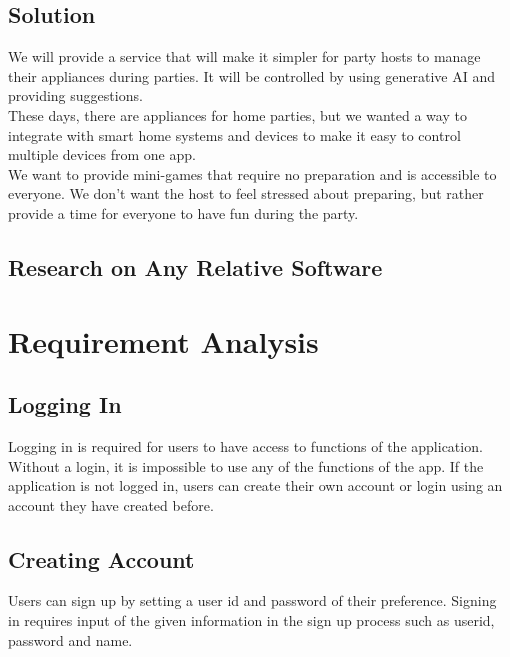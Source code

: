 \documentclass[conference]{IEEEtran}
\begin{document}
    \subsection{Solution}
        We will provide a service that will make it simpler for party hosts to manage their appliances during parties. It will be controlled by using generative AI and providing suggestions.\\
        These days, there are appliances for home parties, but we wanted a way to integrate with smart home systems and devices to make it easy to control multiple devices from one app.\\
        We want to provide  mini-games that require no preparation and is accessible to everyone. We don't want the host to feel stressed about preparing, but rather provide a time for everyone to have fun during the party.

    \subsection{Research on Any Relative Software}
    
    \section{Requirement Analysis}
    
    \subsection{Logging In}
    Logging in is required for users to have access to functions of the application. Without a login, it is impossible to use any of the functions of the app. If the application is not logged in, users can create their own account or login using an account they have created before. 
    
    \subsection{Creating Account}
    Users can sign up by setting a user id and password of their preference. Signing in requires input  of the given information in the sign up process such as userid, password and name.
    
\end{document}
